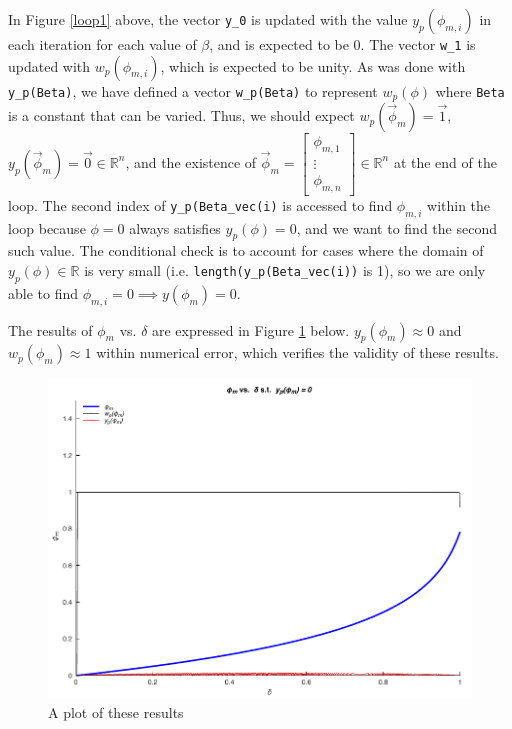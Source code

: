 In Figure \ref{loop1} above, the vector \verb|y_0| is updated with the value $y_p(\phi_{m,i})$ in each iteration
for each value of $\beta$, and is expected to be 0. The vector \verb|w_1| is updated with $w_p(\phi_{m,i})$, which is expected to be unity. As was done with \verb|y_p(Beta)|, 
we have defined a vector \verb|w_p(Beta)| to represent $w_p(\phi)$ where \verb|Beta| is a constant that can be varied.
Thus, we should expect $w_p(\vec\phi_m)=\vec{1}$, $y_p(\vec\phi_m)=\vec{0}\in \mathbb{R}^n$, and the existence of $\vec\phi_m=\begin{bmatrix}\phi_{m,1}\\\vdots\\\phi_{m,n}\end{bmatrix}\in \mathbb{R}^n$ at the end of the loop.
The second index of \verb|y_p(Beta_vec(i)| is accessed to find $\phi_{m,i}$ within the loop because $\phi=0$ always satisfies $y_p(\phi)=0$, and we want to find the second such value.
The conditional check is to account for cases where the domain of $y_p(\phi)\in \mathbb{R}$ is very small (i.e. \verb|length(y_p(Beta_vec(i))| is 1), so we are only able to find $\phi_{m,i}=0\implies y(\phi_m)=0$.

The results of $\phi_m$ vs. $\delta$ are expressed in Figure \ref{yminplot} below. $y_p(\phi_m)\approx 0$ and $w_p(\phi_m)\approx 1$ within numerical error, which verifies the validity of these results.

\begin{figure}[H]
    \centering
    \includegraphics{problem-b/plots/phi_delta_y.pdf}
    \caption{A plot of these results}\label{yminplot}
\end{figure}

